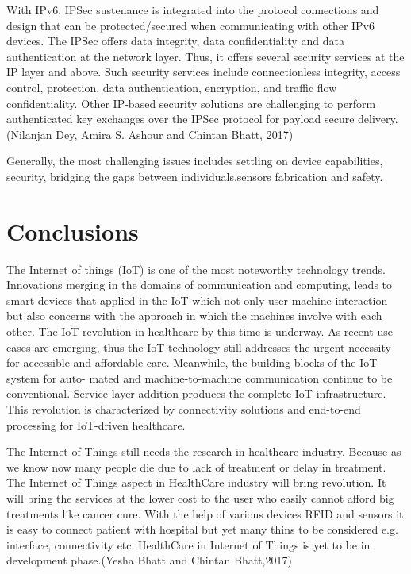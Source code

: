 With IPv6, IPSec sustenance is integrated into the protocol connections and
design that can be protected/secured when communicating with other IPv6 devices.
The IPSec offers data integrity, data confidentiality and data authentication at the
network layer. Thus, it offers several security services at the IP layer and above.
Such security services include connectionless integrity, access control, protection,
data authentication, encryption, and traffic flow confidentiality. Other IP-based
security solutions are challenging to perform authenticated key exchanges over the
IPSec protocol for payload secure delivery.(Nilanjan Dey, Amira S. Ashour and Chintan Bhatt, 2017)
\newline

Generally, the most challenging issues includes settling on device capabilities,
security, bridging the gaps between individuals,sensors fabrication and safety.
\section{Conclusions}

The Internet of things (IoT) is one of the most noteworthy technology trends.
Innovations merging in the domains of communication and computing, leads to
smart devices that applied in the IoT which not only user-machine interaction but
also concerns with the approach in which the machines involve with each other.
The IoT revolution in healthcare by this time is underway. As recent use cases are
emerging, thus the IoT technology still addresses the urgent necessity for accessible
and affordable care. Meanwhile, the building blocks of the IoT system for auto-
mated and machine-to-machine communication continue to be conventional.
Service layer addition produces the complete IoT infrastructure. This revolution is
characterized by connectivity solutions and end-to-end processing for IoT-driven
healthcare. 
\newline

The Internet of Things still needs the research in healthcare industry. Because as we
know now many people die due to lack of treatment or delay in treatment. The
Internet of Things aspect in HealthCare industry will bring revolution. It will bring
the services at the lower cost to the user who easily cannot afford big treatments like
cancer cure. With the help of various devices RFID and sensors it is easy to connect
patient with hospital but yet many thins to be considered e.g. interface, connectivity
etc. HealthCare in Internet of Things is yet to be in development phase.(Yesha Bhatt and Chintan Bhatt,2017)
\newline

